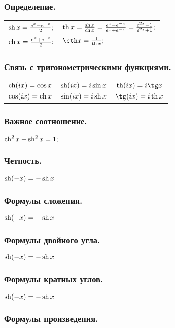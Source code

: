 \subsubsection{Определение.}
\begin{tabular}{l l}
$\mathop{\rm sh}\nolimits x = \frac{e^{x}-e^{-x}}{2};$
&
$\mathop{\rm th}\nolimits x = \frac{\mathop{\rm sh}\nolimits x}{\mathop{\rm ch}\nolimits x}=\frac{e^{x}-e^{-x}}{e^{x}+e^{-x}}=\frac{e^{2x}-1}{e^{2x}+1};$
\\
$\mathop{\rm ch}\nolimits x = \frac{e^{x}+e^{-x}}{2};$
&
$\cth x = \frac{1}{\th x};$
\end{tabular}
\subsubsection{Связь с тригонометрическими функциями.}
\begin{tabular}{c c c}
$\mathop{\rm ch}\nolimits (ix) = \cos x$
&
$\mathop{\rm sh}\nolimits (ix)= i \sin x$
&
$\th (ix) = i \tg x$
\\
$\cos (ix) = \mathop{\rm ch}\nolimits x$
&
$\sin (ix) = i \mathop{\rm sh}\nolimits x$
&
$\tg (ix) = i \th x$
\end{tabular}
\subsubsection{Важное соотношение.}
$\mathop{\rm ch}\nolimits^2 x - \mathop{\rm sh}\nolimits^2 x = 1;$

\subsubsection{Четность.}

$\mathop{\rm sh}\nolimits (-x) = -\mathop{\rm sh}\nolimits x$

\subsubsection{Формулы сложения.}

$\mathop{\rm sh}\nolimits (-x) = -\mathop{\rm sh}\nolimits x$

\subsubsection{Формулы двойного угла.}

$\mathop{\rm sh}\nolimits (-x) = -\mathop{\rm sh}\nolimits x$
\subsubsection{Формулы кратных углов.}

$\mathop{\rm sh}\nolimits (-x) = -\mathop{\rm sh}\nolimits x$
\subsubsection{Формулы произведения.}

